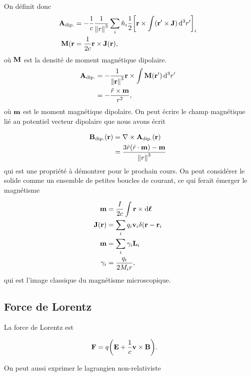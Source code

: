 On définit donc
\begin{align}
    \vb{A}_{\rm dip.}&=-\frac1c\frac1{\norm{r}^3}\sum_i\hat{n}_i\frac12\qty[
    \vb{r}\times\int(\vb{r'}\times\vb{J})\dd[3]{r'}]_i\\
    \vb{M}(\vb{r}&=\frac1{2c}\vb{r}\times\vb{J}(\vb{r}),
\end{align}
où $\vb{M}$ est la densité de moment magnétique dipolaire.
\begin{align}
    \vb{A}_{\rm dip.}&=-\frac1{\norm{\vb{r}}^3}\vb{r}\times
    \int\vb{M}(\vb{r'})\dd[3]{r'}\\
                     &=-\frac{\hat{r}\times\vb{m}}{r^2},
\end{align}
où $\vb{m}$ est le moment magnétique dipolaire. On peut écrire le champ magnétique
lié au potentiel vecteur dipolaire que nous avons écrit

\begin{align}
    \vb{B}_{\rm dip.}(\vb{r})&=\nabla\times\vb{A}_{\rm dip.}(\vb{r})\\
                             &=\frac{3\hat{r}(\hat{r}\cdot\vb{m})-\vb{m}}{\norm{r}^3}
\end{align}
qui est une propriété à démontrer pour le prochain cours. On peut considérer le
solide comme un ensemble de petites boucles de courant, ce qui ferait émerger
le magnétisme

\begin{align}
    \vb{m}&=\frac{I}{2c}\int\vb{r}\times\dd{\boldsymbol{\ell}}\\
    \vb{J}(\vb{r})&=\sum_iq_i\vb{v}_i\delta(\vb{r}-\vb{r}_i\\
    \vb{m}&=\sum_i\gamma_i\vb{L}_i\\
    \gamma_i&=\frac{q_i}{2M_ir},
\end{align}
qui est l'image classique du magnétisme microscopique.


\subsection{Force de Lorentz} %
\label{sub:Force de Lorentx}

La force de Lorentz est

\begin{align}
    \vb{F}&=q\qty(\vb{E}+\frac1c\vb{v}\times\vb{B}).
\end{align}

On peut aussi exprimer le lagrangien non-relativiste

